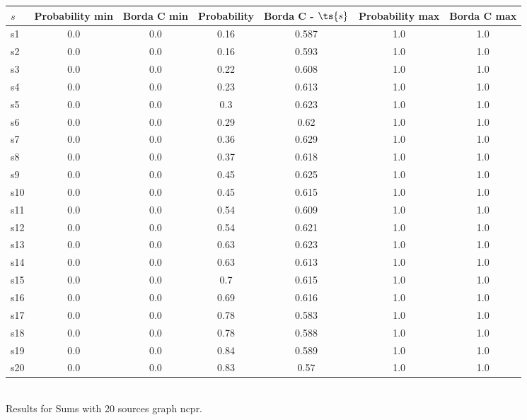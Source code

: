 \documentclass{article}
\begin{document}
\noindent\begin{tabular}{|l|c|c|c|c|c|c|}
\hline
$s$& Probability min & Borda C min & Probability & Borda C - $\ts{s}$ & Probability max & Borda C max\\
\hline
s1 &0.0 & 0.0 & 0.16 & 0.587 & 1.0 & 1.0\\
\hline
s2 &0.0 & 0.0 & 0.16 & 0.593 & 1.0 & 1.0\\
\hline
s3 &0.0 & 0.0 & 0.22 & 0.608 & 1.0 & 1.0\\
\hline
s4 &0.0 & 0.0 & 0.23 & 0.613 & 1.0 & 1.0\\
\hline
s5 &0.0 & 0.0 & 0.3 & 0.623 & 1.0 & 1.0\\
\hline
s6 &0.0 & 0.0 & 0.29 & 0.62 & 1.0 & 1.0\\
\hline
s7 &0.0 & 0.0 & 0.36 & 0.629 & 1.0 & 1.0\\
\hline
s8 &0.0 & 0.0 & 0.37 & 0.618 & 1.0 & 1.0\\
\hline
s9 &0.0 & 0.0 & 0.45 & 0.625 & 1.0 & 1.0\\
\hline
s10 &0.0 & 0.0 & 0.45 & 0.615 & 1.0 & 1.0\\
\hline
s11 &0.0 & 0.0 & 0.54 & 0.609 & 1.0 & 1.0\\
\hline
s12 &0.0 & 0.0 & 0.54 & 0.621 & 1.0 & 1.0\\
\hline
s13 &0.0 & 0.0 & 0.63 & 0.623 & 1.0 & 1.0\\
\hline
s14 &0.0 & 0.0 & 0.63 & 0.613 & 1.0 & 1.0\\
\hline
s15 &0.0 & 0.0 & 0.7 & 0.615 & 1.0 & 1.0\\
\hline
s16 &0.0 & 0.0 & 0.69 & 0.616 & 1.0 & 1.0\\
\hline
s17 &0.0 & 0.0 & 0.78 & 0.583 & 1.0 & 1.0\\
\hline
s18 &0.0 & 0.0 & 0.78 & 0.588 & 1.0 & 1.0\\
\hline
s19 &0.0 & 0.0 & 0.84 & 0.589 & 1.0 & 1.0\\
\hline
s20 &0.0 & 0.0 & 0.83 & 0.57 & 1.0 & 1.0\\
\hline
\end{tabular}\\

\noindent Results for Sums with 20 sources graph ncpr.
\end{document}
